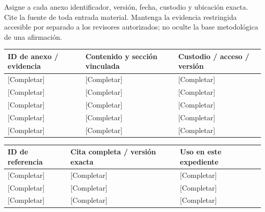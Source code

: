 \begin{Notice}Asigne a cada anexo identificador, versión, fecha, custodio y ubicación exacta. Cite la fuente de toda entrada material. Mantenga la evidencia restringida accesible por separado a los revisores autorizados; no oculte la base metodológica de una afirmación.\end{Notice}
{\sffamily\fontsize{8.3}{10.3}\selectfont\begin{longtable}{@{}P{39.59mm} P{75.89mm} P{49.49mm}@{}}
\toprule
\textbf{ID de anexo / evidencia} & \textbf{Contenido y sección vinculada} & \textbf{Custodio / acceso / versión}\\\midrule\endhead
\rule{0pt}{7.7mm}[Completar] & [Completar] & [Completar]\\\hline
\rule{0pt}{7.7mm}[Completar] & [Completar] & [Completar]\\\hline
\rule{0pt}{7.7mm}[Completar] & [Completar] & [Completar]\\\hline
\rule{0pt}{7.7mm}[Completar] & [Completar] & [Completar]\\\hline
\rule{0pt}{7.7mm}[Completar] & [Completar] & [Completar]\\\hline
\end{longtable}}
{\sffamily\fontsize{8.3}{10.3}\selectfont\begin{longtable}{@{}P{29.69mm} P{82.48mm} P{52.79mm}@{}}
\toprule
\textbf{ID de referencia} & \textbf{Cita completa / versión exacta} & \textbf{Uso en este expediente}\\\midrule\endhead
\rule{0pt}{7.7mm}[Completar] & [Completar] & [Completar]\\\hline
\rule{0pt}{7.7mm}[Completar] & [Completar] & [Completar]\\\hline
\rule{0pt}{7.7mm}[Completar] & [Completar] & [Completar]\\\hline
\end{longtable}}
